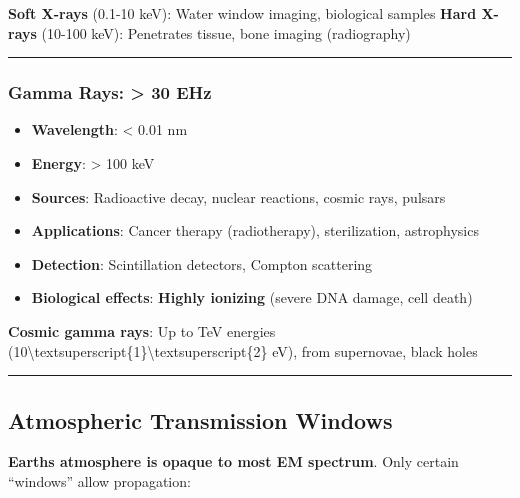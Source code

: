 \textbf{Soft X-rays} (0.1-10 keV): Water window imaging, biological
samples \textbf{Hard X-rays} (10-100 keV): Penetrates tissue, bone
imaging (radiography)

\begin{center}\rule{0.5\linewidth}{0.5pt}\end{center}

\subsubsection{Gamma Rays: \textgreater{} 30
EHz}\label{gamma-rays-30-ehz}

\begin{itemize}
\tightlist
\item
  \textbf{Wavelength}: \textless{} 0.01 nm
\item
  \textbf{Energy}: \textgreater{} 100 keV
\item
  \textbf{Sources}: Radioactive decay, nuclear reactions, cosmic rays,
  pulsars
\item
  \textbf{Applications}: Cancer therapy (radiotherapy), sterilization,
  astrophysics
\item
  \textbf{Detection}: Scintillation detectors, Compton scattering
\item
  \textbf{Biological effects}: \textbf{Highly ionizing} (severe DNA
  damage, cell death)
\end{itemize}

\textbf{Cosmic gamma rays}: Up to TeV energies
(10\textbackslash textsuperscript\{1\}\textbackslash textsuperscript\{2\}
eV), from supernovae, black holes

\begin{center}\rule{0.5\linewidth}{0.5pt}\end{center}

\subsection{Atmospheric Transmission
Windows}\label{atmospheric-transmission-windows}

\textbf{Earth\textquotesingle s atmosphere is opaque to most EM
spectrum}. Only certain ``windows'' allow propagation:

